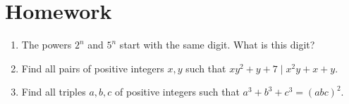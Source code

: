 \documentclass{article}
\begin{document}
\section{Homework}
  \begin{enumerate}
  \item The powers $2^n$ and $5^n$ start with the same digit. What is this
    digit?
    \item Find all pairs of positive integers $x,y$ such that $xy^2+y+7\mid
      x^2y+x+y$.
    \item Find all triples $a,b,c$ of positive integers such that
      $a^3+b^3+c^3=(abc)^2$.
  \end{enumerate}
\end{document}
